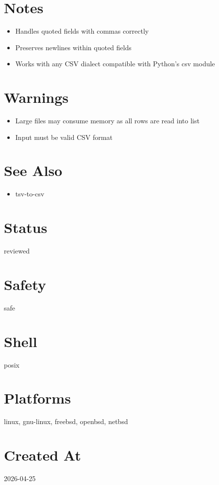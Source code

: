 \documentclass[openany]{book}
\begin{document}
\section*{Notes}
\begin{itemize}
  \item Handles quoted fields with commas correctly
  \item Preserves newlines within quoted fields
  \item Works with any CSV dialect compatible with Python's csv module
\end{itemize}

\section*{Warnings}
\begin{itemize}
  \item Large files may consume memory as all rows are read into list
  \item Input must be valid CSV format
\end{itemize}

\section*{See Also}
\begin{itemize}
  \item tsv-to-csv
\end{itemize}

\section*{Status}
reviewed

\section*{Safety}
safe

\section*{Shell}
posix

\section*{Platforms}
linux, gnu-linux, freebsd, openbsd, netbsd

\section*{Created At}
2026-04-25
\end{document}
